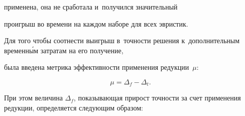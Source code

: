 


\noindent

 применена, она не сработала и~получился значительный 

про\-иг\-рыш во времени на каж\-дом наборе для всех эв\-ри\-стик.





Для того чтобы соотнести выигрыш в~точности решения к~дополнительным временн\'{ы}м за\-тра\-там на его получение, 

была введена мет\-ри\-ка эф\-фек\-тив\-ности применения редукции~$\mu$:



\noindent

\begin{equation*}

    \mu = \Delta_f - \Delta_t.

\end{equation*}

При этом величина $\Delta_f$, по\-ка\-зы\-ва\-ющая при\-рост точ\-ности за счет применения редукции, определяется сле\-ду\-ющим образом:

